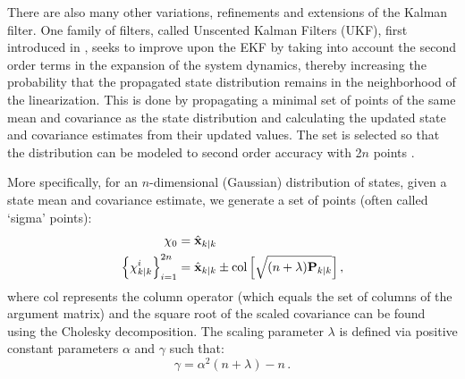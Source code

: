 There are also many other variations, refinements and extensions of the Kalman filter.  One family of filters, called Unscented Kalman Filters (UKF), first introduced in \citet{julier1995new}, seeks to improve upon the EKF by taking into account the second order terms in the expansion of the system dynamics, thereby increasing the probability that the propagated state distribution remains in the neighborhood of the linearization.  	This is done by propagating a minimal set of points of the same mean and covariance as the state distribution and calculating the updated state and covariance estimates from their updated values.  The set is selected so that the distribution can be modeled to second order accuracy with 2$n$ points \citep{julier1995new,julier2004unscented,van2001square}.  

More specifically, for an $n$-dimensional (Gaussian) distribution of states, given a state mean and covariance estimate, we generate a set of points (often called `sigma' points):
\begin{align}
\chi_0 &= \hat{\mathbf x}_{k|k}\\
\left\{\chi_{k|k}^i\right\}_{i=1}^{2n} &= \hat{\mathbf x}_{k|k} \pm \textrm{col}\left[ \sqrt{(n+\lambda) \mathbf P_{k|k}}\right], 
\end{align}
where col represents the column operator (which equals the set of columns of the argument matrix) and the square root of the scaled covariance can be found using the Cholesky decomposition.  The scaling parameter $\lambda$ is defined via positive constant parameters $\alpha$ and $\gamma$ such that:
\begin{equation}
\gamma = \alpha^2(n  + \lambda) - n\,.
\end{equation}


